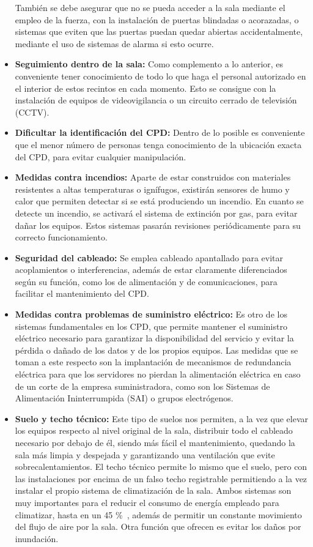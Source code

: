 \begin{itemize}
	También se debe asegurar que no se pueda acceder a la sala mediante el empleo de la fuerza, con la instalación de puertas blindadas o acorazadas, o sistemas que eviten que las puertas puedan quedar abiertas accidentalmente, mediante el uso de sistemas de alarma si esto ocurre.
	\item \textbf{Seguimiento dentro de la sala:} Como complemento a lo anterior, es conveniente tener conocimiento de todo lo que haga el personal autorizado en el interior de estos recintos en cada momento. Esto se consigue con la instalación de equipos de videovigilancia o un circuito cerrado de televisión (CCTV).
	\item \textbf{Dificultar la identificación del CPD:} Dentro de lo posible es conveniente que el menor número de personas tenga conocimiento de la ubicación exacta del CPD, para evitar cualquier manipulación.
	\item \textbf{Medidas contra incendios:} Aparte de estar construidos con materiales resistentes a altas temperaturas o ignífugos, existirán sensores de humo y calor que permiten detectar si se está produciendo un incendio. En cuanto se detecte un incendio, se activará el sistema de extinción por gas, para evitar dañar los equipos. Estos sistemas pasarán revisiones periódicamente para su correcto funcionamiento.
	      \pagebreak
	\item \textbf{Seguridad del cableado:} Se emplea cableado apantallado para evitar acoplamientos o interferencias, además de estar claramente diferenciados según su función, como los de alimentación y de comunicaciones, para facilitar el mantenimiento del CPD\@.
	\item \textbf{Medidas contra problemas de suministro eléctrico:} Es otro de los sistemas fundamentales en los CPD, que permite mantener el suministro eléctrico necesario para garantizar la disponibilidad del servicio y evitar la pérdida o dañado de los datos y de los propios equipos. Las medidas que se toman a este respecto son la implantación de mecanismos de redundancia eléctrica para que los servidores no pierdan la alimentación eléctrica en caso de un corte de la empresa suministradora, como son los Sistemas de Alimentación Ininterrumpida (SAI) o grupos electrógenos.
	\item \textbf{Suelo y techo técnico:} Este tipo de suelos nos permiten, a la vez que elevar los equipos respecto al nivel original de la sala, distribuir todo el cableado necesario por debajo de él, siendo más fácil el mantenimiento, quedando la sala más limpia y despejada y garantizando una ventilación que evite sobrecalentamientos. El techo técnico permite lo mismo que el suelo, pero con las instalaciones por encima de un falso techo registrable permitiendo a la vez instalar el propio sistema de climatización de la sala. Ambos sistemas son muy importantes para el reducir el consumo de energía empleado para climatizar, hasta en un 45 \%~\cite{noauthor_suelo_2020}, además de permitir un constante movimiento del flujo de aire por la sala. Otra función que ofrecen es evitar los daños por inundación.

\end{itemize}

